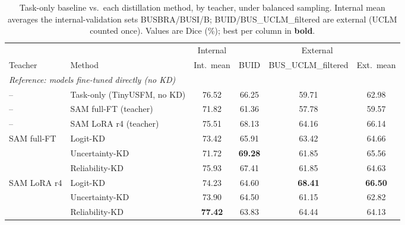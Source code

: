 \begin{table}[t]
\centering
\caption{Task-only baseline vs.\ each distillation method, by teacher, under balanced sampling. Internal mean averages the internal-validation sets BUSBRA/BUSI/B; BUID/BUS\_UCLM\_filtered are external (UCLM counted once). Values are Dice (\%); best per column in \textbf{bold}.}
\label{tab:kd_reliability_by_dataset}
\setlength{\tabcolsep}{6pt}
\begin{tabular}{ll*{4}{c}}
\toprule
 & & \multicolumn{1}{c}{Internal} & \multicolumn{3}{c}{External} \\
\cmidrule(lr){3-3} \cmidrule(lr){4-6}
Teacher & Method & Int.\ mean & BUID & BUS\_UCLM\_filtered & Ext.\ mean \\
\midrule
\multicolumn{6}{l}{\textit{Reference: models fine-tuned directly (no KD)}}\\
-- & Task-only (TinyUSFM, no KD) & 76.52 & 66.25 & 59.71 & 62.98 \\
-- & SAM full-FT (teacher) & 71.82 & 61.36 & 57.78 & 59.57 \\
-- & SAM LoRA r4 (teacher) & 75.51 & 68.13 & 64.16 & 66.14 \\
\midrule
\multirow{3}{*}{SAM full-FT}
 & Logit-KD       & 73.42 & 65.91 & 63.42 & 64.66 \\
 & Uncertainty-KD & 71.72 & \textbf{69.28} & 61.85 & 65.56 \\
 & Reliability-KD & 75.93 & 67.41 & 61.85 & 64.63 \\
\midrule
\multirow{3}{*}{SAM LoRA r4}
 & Logit-KD       & 74.23 & 64.60 & \textbf{68.41} & \textbf{66.50} \\
 & Uncertainty-KD & 73.90 & 64.50 & 61.15 & 62.82 \\
 & Reliability-KD & \textbf{77.42} & 63.83 & 64.44 & 64.13 \\
\bottomrule
\end{tabular}
\end{table}
